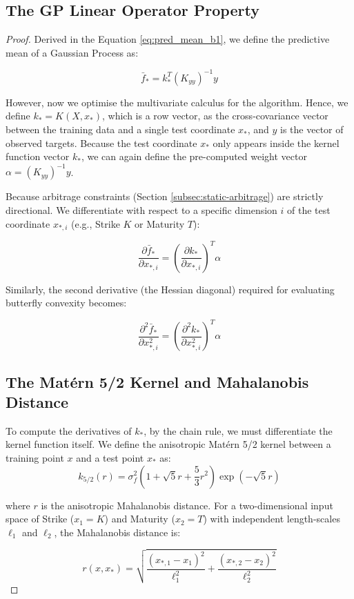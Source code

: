 \documentclass[12pt,oneside]{report}
\theoremstyle{definition}
\theoremstyle{remark}
\begin{document}
\subsection{The GP Linear Operator Property}
\begin{proof}
Derived in the Equation \ref{eq:pred_mean_b1}, we define the predictive mean of a Gaussian Process as:

$$\bar{f}_* = k_*^T (K_{yy})^{-1} y$$

However, now we optimise the multivariate calculus for the algorithm. Hence, we define $k_* = K(X, x_*)$, which is a row vector, as the cross-covariance vector between the training data and a single test coordinate $x_*$, and $y$ is the vector of observed targets. Because the test coordinate $x_*$ only appears inside the kernel function vector $k_*$, we can again define the pre-computed weight vector $\alpha = (K_{yy})^{-1} y$.

Because arbitrage constraints (Section \ref{subsec:static-arbitrage}) are strictly directional. We differentiate with respect to a specific dimension $i$ of the test coordinate $x_{*, i}$ (e.g., Strike $K$ or Maturity $T$):

$$\frac{\partial \bar{f}_*}{\partial x_{*, i}} = \left( \frac{\partial k_*}{\partial x_{*, i}} \right)^T \alpha$$

Similarly, the second derivative (the Hessian diagonal) required for evaluating butterfly convexity becomes:

$$\frac{\partial^2 \bar{f}_*}{\partial x_{*, i}^2} = \left( \frac{\partial^2 k_*}{\partial x_{*, i}^2} \right)^T \alpha$$

\subsection{The Matérn 5/2 Kernel and Mahalanobis Distance}
To compute the derivatives of $k_*$, by the chain rule, we must differentiate the kernel function itself. We define the anisotropic Matérn 5/2 kernel between a training point $x$ and a test point $x_*$ as:
$$k_{5/2}(r) = \sigma_f^2 \left( 1 + \sqrt{5}r + \frac{5}{3}r^2 \right) \exp(-\sqrt{5}r)$$

where $r$ is the anisotropic Mahalanobis distance. For a two-dimensional input space of Strike ($x_1 = K$) and Maturity ($x_2 = T$) with independent length-scales $\ell_1$ and $\ell_2$, the Mahalanobis distance is:

$$r(x, x_*) = \sqrt{ \frac{(x_{*, 1} - x_1)^2}{\ell_1^2} + \frac{(x_{*, 2} - x_2)^2}{\ell_2^2} }$$


\end{proof}
\end{document}
